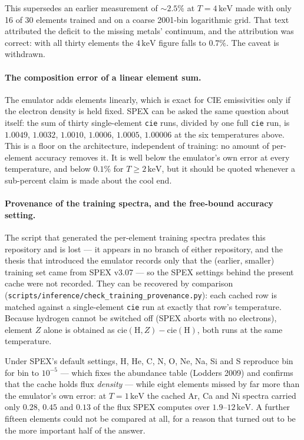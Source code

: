 \documentclass[11pt,a4paper]{article}
\newcommand{\kev}{\,\mathrm{keV}}
\newcommand{\code}[1]{\texttt{#1}}
\begin{document}
This supersedes an earlier measurement of $\sim2.5\%$ at $T=4\kev$ made with
only 16 of 30 elements trained and on a coarse 2001-bin logarithmic grid. That
text attributed the deficit to the missing metals' continuum, and the
attribution was correct: with all thirty elements the $4\kev$ figure falls to
$0.7\%$. The caveat is withdrawn.

\paragraph{The composition error of a linear element sum.} The emulator adds
elements linearly, which is exact for CIE emissivities only if the electron
density is held fixed. SPEX can be asked the same question about itself: the
sum of thirty single-element \code{cie} runs, divided by one full \code{cie}
run, is $1.0049$, $1.0032$, $1.0010$, $1.0006$, $1.0005$, $1.00006$ at the six
temperatures above. This is a floor on the architecture, independent of
training: no amount of per-element accuracy removes it. It is well below the
emulator's own error at every temperature, and below $0.1\%$ for $T\ge2\kev$,
but it should be quoted whenever a sub-percent claim is made about the cool
end.

\paragraph{Provenance of the training spectra, and the free-bound accuracy
setting.}\label{par:gacc} The script that generated the per-element training
spectra predates this repository and is lost --- it appears in no branch of
either repository, and the thesis that introduced the emulator records only
that the (earlier, smaller) training set came from SPEX v3.07 --- so the SPEX
settings behind the present cache were not recorded. They can be recovered by
comparison
(\code{scripts/inference/check\_training\_provenance.py}): each cached row is
matched against a single-element \code{cie} run at exactly that row's
temperature. Because hydrogen cannot be switched off (SPEX aborts with no
electrons), element $Z$ alone is obtained as $\mathrm{cie}(\mathrm{H},Z) -
\mathrm{cie}(\mathrm{H})$, both runs at the same temperature.

Under SPEX's default settings, H, He, C, N, O, Ne, Na, Si and S reproduce bin
for bin to $10^{-5}$ --- which fixes the abundance table (Lodders 2009) and
confirms that the cache holds flux \emph{density} --- while eight elements
missed by far more than the emulator's own error: at $T=1\kev$ the cached Ar,
Ca and Ni spectra carried only $0.28$, $0.45$ and $0.13$ of the flux SPEX
computes over $1.9$--$12\kev$. A further fifteen elements could not be compared
at all, for a reason that turned out to be the more important half of the
answer.
\end{document}
